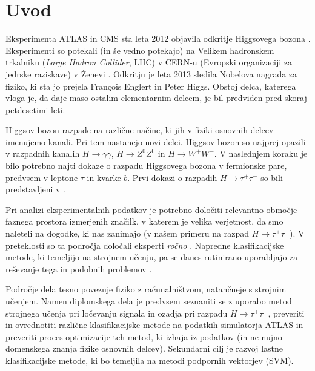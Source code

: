 \documentclass[11pt,a4paper,openany]{book}
\begin{document}
\chapter*{Uvod}

Eksperimenta ATLAS in CMS sta leta 2012 objavila odkritje Higgsovega bozona \cite{Aad20121,Chatrchyan201230}. Eksperimenti so potekali (in še vedno potekajo) na Velikem hadronskem trkalniku (\textit{Large Hadron Collider}, LHC) v CERN-u (Evropski organizaciji za jedrske raziskave) v Ženevi \cite{ChallengeDoc}. Odkritju je leta 2013 sledila Nobelova nagrada za fiziko, ki sta jo prejela François Englert in Peter Higgs. Obstoj delca, katerega vloga je, da daje maso ostalim elementarnim delcem, je bil predviden pred skoraj petdesetimi leti. 

Higgsov bozon razpade na različne načine, ki jih v fiziki osnovnih delcev imenujemo kanali. Pri tem nastanejo novi delci. Higgsov bozon so najprej opazili v razpadnih kanalih $H \rightarrow \gamma\gamma$, $H \rightarrow Z^0Z^0$ in $H \rightarrow W^+W^-$. V naslednjem koraku je bilo potrebno najti dokaze o razpadu Higgsovega bozona v fermionske pare, predvsem v leptone $\tau$ in kvarke $b$. Prvi dokazi o razpadih $H \rightarrow \tau^+\tau^-$ so bili predstavljeni v \cite{atlas2013,atlas2015htautau}.

Pri analizi eksperimentalnih podatkov je potrebno določiti relevantno območje faznega prostora izmerjenih značilk, v katerem je velika verjetnost, da smo naleteli na dogodke, ki nas zanimajo (v našem primeru na razpad $H \rightarrow \tau^+\tau^-$). V preteklosti so ta področja določali eksperti \textit{ročno} \cite{Adam-Bourdarios14}. Napredne klasifikacijske metode, ki temeljijo na strojnem učenju, pa se danes rutinirano uporabljajo za reševanje tega in podobnih problemov \cite{atlas2013}.

Področje dela tesno povezuje fiziko z računalništvom, natančneje s strojnim učenjem. Namen diplomskega dela je predvsem seznaniti se z uporabo metod strojnega učenja pri ločevanju signala in ozadja pri razpadu $H \rightarrow \tau^+\tau^-$, preveriti in ovrednotiti različne klasifikacijske metode na podatkih simulatorja ATLAS in preveriti proces optimizacije teh metod, ki izhaja iz podatkov (in ne nujno domenskega znanja fizike osnovnih delcev). Sekundarni cilj je razvoj lastne klasifikacijske metode, ki bo temeljila na metodi podpornih vektorjev (SVM).
\end{document}
